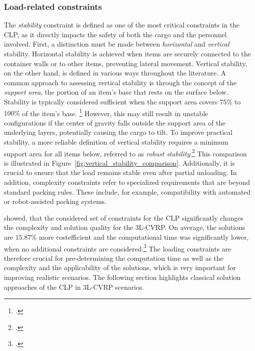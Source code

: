 \subsubsection{Load-related constraints}

The \textit{stability} constraint is defined as one of the most critical constraints
in the \gls{CLP}, as it directly impacts the safety of both the cargo and the personnel involved.
First, a distinction must be made between \textit{horizontal} and \textit{vertical} stability.
Horizontal stability is achieved when items are securely connected to the
container walls or to other items, preventing lateral movement. Vertical
stability, on the other hand, is defined in various ways throughout the
literature. A common approach to assessing vertical stability is through the concept of the \textit{support
    area}, the portion of an item's base that rests on the surface below. Stability is typically
considered sufficient when the support area covers $75\%$ to $100\%$ of the item’s base. \footcite[cf.][p. 344]{gendreau_tabu_2006} However,
this may still result in unstable configurations if the center of gravity falls outside the
support area of the underlying layers, potentially causing the cargo to tilt. To improve practical stability,
a more reliable definition of vertical stability requires a minimum support area for all items below,
referred to as \textit{robust stability}.\footcite[cf.][p. 1140]{ceschia_local_2013} This comparison is illustrated in Figure~\ref{fig:vertical_stability_comparison}.
Additionally, it is crucial to ensure that the load remains stable even after partial unloading.
In addition, complexity constraints refer to specialized
requirements that are beyond standard packing rules. These include, for example, compatibility with automated or robot-assisted packing systems.


\cite{gendreau_tabu_2006} showed, that the considered set of constraints for the \gls{CLP} significantly
changes the complexity and solution quality for the \gls{3L-CVRP}. On average, the solutions are $15.87\%$ more
costefficient and the computational time was significantly lower, when no additional constraints are considered.\footcite[cf.][p.348]{gendreau_tabu_2006}
The loading constraints are therefore crucial for pre-determining the computation time as well as the complexity and the applicability
of the solutions, which is very important for improving realistic scenarios.
The following section highlights classical solution approaches of the \gls{CLP} in \gls{3L-CVRP} scenarios.


